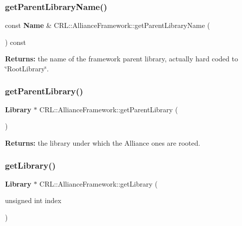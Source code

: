 \subsubsection{\texorpdfstring{get\+Parent\+Library\+Name()}{getParentLibraryName()}}
{\footnotesize\ttfamily const \textbf{ Name} \& C\+R\+L\+::\+Alliance\+Framework\+::get\+Parent\+Library\+Name (\begin{DoxyParamCaption}{ }\end{DoxyParamCaption}) const\hspace{0.3cm}{\ttfamily [inline]}}

{\bfseries Returns\+:} the name of the framework parent library, actually hard coded to \char`\"{}\+Root\+Library\char`\"{}. \mbox{\label{classCRL_1_1AllianceFramework_afe822e9e04b613862aec5066743e1ffd}} 
\subsubsection{\texorpdfstring{get\+Parent\+Library()}{getParentLibrary()}}
{\footnotesize\ttfamily \textbf{ Library} $\ast$ C\+R\+L\+::\+Alliance\+Framework\+::get\+Parent\+Library (\begin{DoxyParamCaption}{ }\end{DoxyParamCaption})\hspace{0.3cm}{\ttfamily [inline]}}

{\bfseries Returns\+:} the library under which the Alliance ones are rooted. \mbox{\label{classCRL_1_1AllianceFramework_ab6f9ac0f07b20c2444b13ef8bc55c9ea}} 
\subsubsection{\texorpdfstring{get\+Library()}{getLibrary()}}
{\footnotesize\ttfamily \textbf{ Library} $\ast$ C\+R\+L\+::\+Alliance\+Framework\+::get\+Library (\begin{DoxyParamCaption}\item[{unsigned int}]{index }\end{DoxyParamCaption})}

